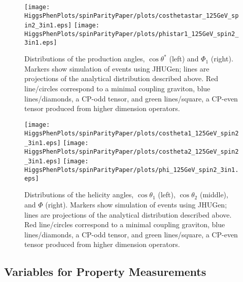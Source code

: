 \begin{figure}
\begin{center}
\texttt{[image: HiggsPhenPlots/spinParityPaper/plots/costhetastar\_125GeV\_spin2\_3in1.eps]}
\texttt{[image: HiggsPhenPlots/spinParityPaper/plots/phistar1\_125GeV\_spin2\_3in1.eps]}
\label{fig:TensorProdAngles}
\caption{Distributions of the production angles, $\cos\theta^*$ (left) and
$\Phi_1$ (right). Markers show simulation of events using JHUGen; lines
are projections
of the analytical distribution described above.  Red line/circles correspond
to a minimal coupling graviton, blue lines/diamonds, a CP-odd tensor, 
and green lines/square, 
a CP-even tensor produced from higher dimension operators.}
\end{center}
\end{figure}

\begin{figure}
\begin{center}
\texttt{[image: HiggsPhenPlots/spinParityPaper/plots/costheta1\_125GeV\_spin2\_3in1.eps]}
\texttt{[image: HiggsPhenPlots/spinParityPaper/plots/costheta2\_125GeV\_spin2\_3in1.eps]}
\texttt{[image: HiggsPhenPlots/spinParityPaper/plots/phi\_125GeV\_spin2\_3in1.eps]}
\label{fig:TensorHelicityAngles}
\caption{Distributions of the helicity angles, $\cos\theta_1$ (left), 
$\cos\theta_2$ (middle), and $\Phi$ (right). Markers show simulation of 
events using JHUGen; lines are projections
of the analytical distribution described above.  Red line/circles correspond
to a minimal coupling graviton, blue lines/diamonds, a CP-odd tensor, 
and green lines/square, 
a CP-even tensor produced from higher dimension operators.}
\end{center}
\end{figure}

\subsection{Variables for Property Measurements}
\label{sec:Spin-parity}

